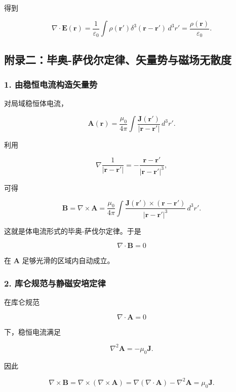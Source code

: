 得到

\[
\nabla\cdot\mathbf E(\mathbf r)
=\frac1{\varepsilon_0}
\int\rho(\mathbf r')
\delta^3(\mathbf r-\mathbf r')\,d^3r'
=\frac{\rho(\mathbf r)}{\varepsilon_0}.
\]

\subsection{附录二：毕奥-萨伐尔定律、矢量势与磁场无散度}\label{m7:ux9644ux5f55ux4e8cux6bd5ux5965-ux8428ux4f10ux5c14ux5b9aux5f8bux77e2ux91cfux52bfux4e0eux78c1ux573aux65e0ux6563ux5ea6}

\subsubsection{1.
由稳恒电流构造矢量势}\label{m7:ux7531ux7a33ux6052ux7535ux6d41ux6784ux9020ux77e2ux91cfux52bf}

对局域稳恒体电流，

\[
\mathbf A(\mathbf r)
=\frac{\mu_0}{4\pi}
\int\frac{\mathbf J(\mathbf r')}
{|\mathbf r-\mathbf r'|}\,d^3r'.
\]

利用

\[
\nabla\frac1{|\mathbf r-\mathbf r'|}
=-\frac{\mathbf r-\mathbf r'}
{|\mathbf r-\mathbf r'|^3},
\]

可得

\[
\mathbf B
=\nabla\times\mathbf A
=\frac{\mu_0}{4\pi}
\int
\frac{\mathbf J(\mathbf r')\times(\mathbf r-\mathbf r')}
{|\mathbf r-\mathbf r'|^3}
\,d^3r'.
\]

这就是体电流形式的毕奥-萨伐尔定律。于是

\[
\nabla\cdot\mathbf B=0
\]

在 \(\mathbf A\) 足够光滑的区域内自动成立。

\subsubsection{2.
库仑规范与静磁安培定律}\label{m7:ux5e93ux4ed1ux89c4ux8303ux4e0eux9759ux78c1ux5b89ux57f9ux5b9aux5f8b}

在库仑规范

\[
\nabla\cdot\mathbf A=0
\]

下，稳恒电流满足

\[
\nabla^2\mathbf A=-\mu_0\mathbf J.
\]

因此

\[
\nabla\times\mathbf B
=\nabla\times(\nabla\times\mathbf A)
=\nabla(\nabla\cdot\mathbf A)-\nabla^2\mathbf A
=\mu_0\mathbf J.
\]

